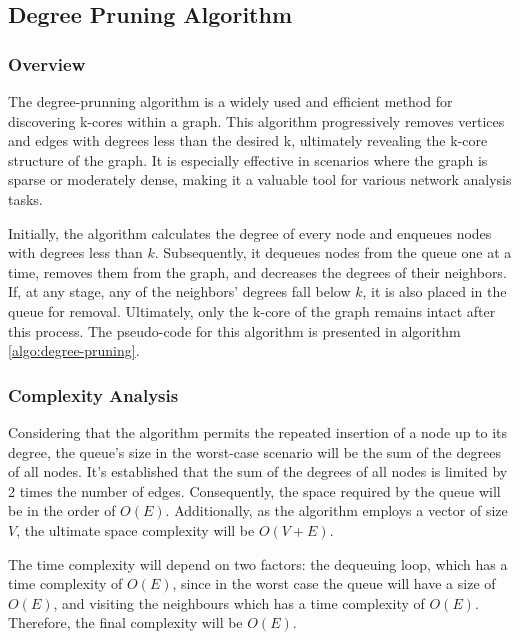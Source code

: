 \label{Algorithms}

\subsection{Degree Pruning Algorithm}

\subsubsection{Overview}

The degree-prunning algorithm is a widely used and efficient method for discovering k-cores within a graph. This algorithm progressively removes vertices and edges with degrees less than the desired k, ultimately revealing the k-core structure of the graph. It is especially effective in scenarios where the graph is sparse or moderately dense, making it a valuable tool for various network analysis tasks. 

Initially, the algorithm calculates the degree of every node and enqueues nodes with degrees less than $k$. Subsequently, it dequeues nodes from the queue one at a time, removes them from the graph, and decreases the degrees of their neighbors. If, at any stage, any of the neighbors' degrees fall below $k$, it is also placed in the queue for removal. Ultimately, only the k-core of the graph remains intact after this process. The pseudo-code for this algorithm is presented in algorithm \ref{algo:degree-pruning}.



\subsubsection{Complexity Analysis}

Considering that the algorithm permits the repeated insertion of a node up to its degree, the queue's size in the worst-case scenario will be the sum of the degrees of all nodes. It's established that the sum of the degrees of all nodes is limited by 2 times the number of edges. Consequently, the space required by the queue will be in the order of $O(E)$. Additionally, as the algorithm employs a vector of size $V$, the ultimate space complexity will be $O(V + E)$.

The time complexity will depend on two factors: the dequeuing loop, which has a time complexity of $O(E)$, since in the worst case the queue will have a size of $O(E)$, and visiting the neighbours which has a time complexity of $O(E)$. Therefore, the final complexity will be $O(E)$.

